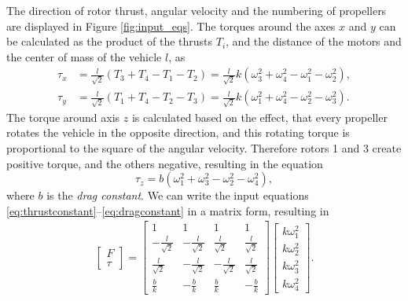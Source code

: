 
The direction of rotor thrust, angular velocity and the numbering of propellers are displayed in Figure \ref{fig:input_eqs}. The torques around the axes $x$ and $y$ can be calculated as the product of the thrusts $T_i$, and the distance of the motors and the center of mass of the vehicle $l$, as
\begin{align}
\tau_x &= \frac{l}{\sqrt{2}}(T_3+T_4-T_1-T_2) =  \frac{l}{\sqrt{2}} k \left(\omega_3^2+\omega_4^2-\omega_1^2-\omega_2^2\right),\\
\tau_y &= \frac{l}{\sqrt{2}}(T_1+T_4-T_2-T_3) =  \frac{l}{\sqrt{2}}k \left(\omega_1^2+\omega_4^2-\omega_2^2-\omega_3^2\right).
\end{align}
The torque around axis $z$ is calculated based on the effect, that every propeller rotates the vehicle in the opposite direction, and this rotating torque is proportional to the square of the angular velocity. Therefore rotors 1 and 3 create positive torque, and the others negative, resulting in the equation
\begin{equation}\label{eq:dragconstant}
\tau_z = b\left(\omega_1^2+\omega_3^2-\omega_2^2-\omega_4^2\right),
\end{equation}
where $b$ is the \textit{drag constant}. We can write the input equations \eqref{eq:thrustconstant}--\eqref{eq:dragconstant} in a matrix form, resulting in
\begin{align}\label{eq:inputs}
\begin{bmatrix}F \\ \tau\end{bmatrix}=\begin{bmatrix}1 & 1 & 1 & 1 \\ -\frac{l}{\sqrt{2}} &  -\frac{l}{\sqrt{2}} &  \frac{l}{\sqrt{2}} &  \frac{l}{\sqrt{2}} \\  \frac{l}{\sqrt{2}} & -\frac{l}{\sqrt{2}} &  -\frac{l}{\sqrt{2}} &  \frac{l}{\sqrt{2}} \\ \frac{b}{k} & -\frac{b}{k} & \frac{b}{k} & -\frac{b}{k}\end{bmatrix}\begin{bmatrix} k \omega_{1}^{2} \\ k \omega_{2}^{2} \\ k \omega_{3}^{2} \\ k \omega_{4}^{2}\end{bmatrix}.
\end{align}

